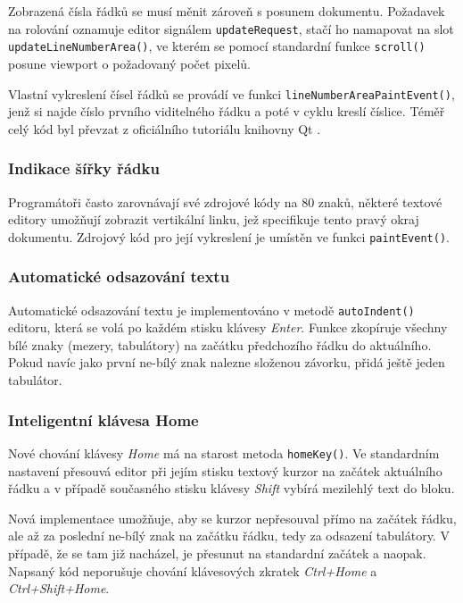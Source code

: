 \documentclass[11pt,twoside,a4paper]{book}
\begin{document}
Zobrazená čísla řádků se musí měnit zároveň s posunem dokumentu. Požadavek na rolování oznamuje editor signálem \texttt{updateRequest}, stačí ho namapovat na slot \texttt{up\-da\-te\-Li\-ne\-Num\-ber\-A\-re\-a()}, ve kterém se pomocí standardní funkce \texttt{scroll()} posune viewport o požadovaný počet pixelů.

Vlastní vykreslení čísel řádků se provádí ve funkci \texttt{lineNumberAreaPaintEvent()}, jenž si najde číslo prvního viditelného řádku a poté v cyklu kreslí číslice. Téměř celý kód byl převzat z oficiálního tutoriálu knihovny Qt \cite{code_editor_example}.


\subsubsection{Indikace šířky řádku}

Programátoři často zarovnávají své zdrojové kódy na 80 znaků, některé textové editory umožňují zobrazit vertikální linku, jež specifikuje tento pravý okraj dokumentu. Zdrojový kód pro její vykreslení je umístěn ve funkci \texttt{paintEvent()}.


\subsubsection{Automatické odsazování textu}

Automatické odsazování textu je implementováno v metodě \texttt{autoIndent()} editoru, která se volá po každém stisku klávesy \textit{Enter}. Funkce zkopíruje všechny bílé znaky (mezery, tabulátory) na začátku předchozího řádku do aktuálního. Pokud navíc jako první ne-bílý znak nalezne složenou závorku, přidá ještě jeden tabulátor.


\subsubsection{Inteligentní klávesa Home}

Nové chování klávesy \textit{Home} má na starost metoda \texttt{homeKey()}. Ve standardním nastavení přesouvá editor při jejím stisku textový kurzor na začátek aktuálního řádku a v případě současného stisku klávesy \textit{Shift} vybírá mezilehlý text do bloku.

Nová implementace umožňuje, aby se kurzor nepřesouval přímo na začátek řádku, ale až za poslední ne-bílý znak na začátku řádku, tedy za odsazení tabulátory. V případě, že se tam již nacházel, je přesunut na standardní začátek a naopak. Napsaný kód neporušuje chování klávesových zkratek \textit{Ctrl+Home} a \textit{Ctrl+Shift+Home}.
\end{document}
